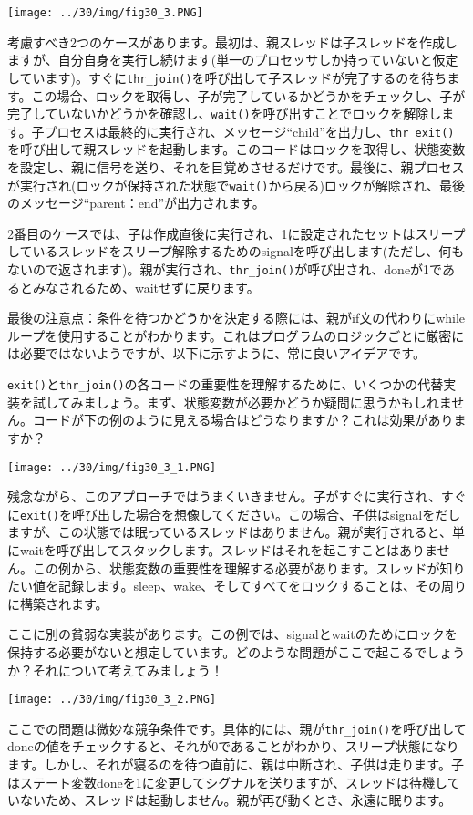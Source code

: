 \texttt{[image: ../30/img/fig30\_3.PNG]}

考慮すべき2つのケースがあります。最初は、親スレッドは子スレッドを作成しますが、自分自身を実行し続けます(単一のプロセッサしか持っていないと仮定しています)。すぐに\texttt{thr\_join()}を呼び出して子スレッドが完了するのを待ちます。この場合、ロックを取得し、子が完了しているかどうかをチェックし、子が完了していないかどうかを確認し、\texttt{wait()}を呼び出すことでロックを解除します。子プロセスは最終的に実行され、メッセージ``child''を出力し、\texttt{thr\_exit()}を呼び出して親スレッドを起動します。このコードはロックを取得し、状態変数を設定し、親に信号を送り、それを目覚めさせるだけです。最後に、親プロセスが実行され(ロックが保持された状態で\texttt{wait()}から戻る)ロックが解除され、最後のメッセージ``parent：end''が出力されます。

2番目のケースでは、子は作成直後に実行され、1に設定されたセットはスリープしているスレッドをスリープ解除するためのsignalを呼び出します(ただし、何もないので返されます)。親が実行され、\texttt{thr\_join()}が呼び出され、doneが1であるとみなされるため、waitせずに戻ります。

最後の注意点：条件を待つかどうかを決定する際には、親がif文の代わりにwhileループを使用することがわかります。これはプログラムのロジックごとに厳密には必要ではないようですが、以下に示すように、常に良いアイデアです。

\texttt{exit()}と\texttt{thr\_join()}の各コードの重要性を理解するために、いくつかの代替実装を試してみましょう。まず、状態変数が必要かどうか疑問に思うかもしれません。コードが下の例のように見える場合はどうなりますか？これは効果がありますか？

\texttt{[image: ../30/img/fig30\_3\_1.PNG]}

残念ながら、このアプローチではうまくいきません。子がすぐに実行され、すぐに\texttt{exit()}を呼び出した場合を想像してください。この場合、子供はsignalをだしますが、この状態では眠っているスレッドはありません。親が実行されると、単にwaitを呼び出してスタックします。スレッドはそれを起こすことはありません。この例から、状態変数の重要性を理解する必要があります。スレッドが知りたい値を記録します。sleep、wake、そしてすべてをロックすることは、その周りに構築されます。

ここに別の貧弱な実装があります。この例では、signalとwaitのためにロックを保持する必要がないと想定しています。どのような問題がここで起こるでしょうか？それについて考えてみましょう！

\texttt{[image: ../30/img/fig30\_3\_2.PNG]}

ここでの問題は微妙な競争条件です。具体的には、親が\texttt{thr\_join()}を呼び出してdoneの値をチェックすると、それが0であることがわかり、スリープ状態になります。しかし、それが寝るのを待つ直前に、親は中断され、子供は走ります。子はステート変数doneを1に変更してシグナルを送りますが、スレッドは待機していないため、スレッドは起動しません。親が再び動くとき、永遠に眠ります。

